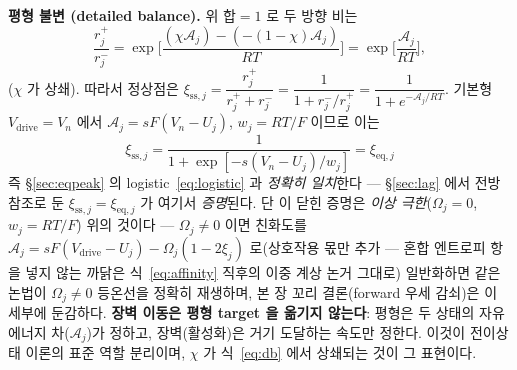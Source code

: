 \documentclass[11pt,a4paper]{article}
\newcommand{\eq}{\mathrm{eq}}
\newcommand{\drive}{\mathrm{drive}}
\newcommand{\sstat}{\mathrm{ss}}
\begin{document}
\textbf{평형 불변 (detailed balance).} 위 합$=1$ 로 두 방향 비는
\begin{equation}
\frac{r_j^+}{r_j^-}=\exp\!\Big[\frac{(\chi\mathcal A_j)-(-(1-\chi)\mathcal A_j)}{RT}\Big]
=\exp\!\Big[\frac{\mathcal A_j}{RT}\Big],
\label{eq:db}
\end{equation}
($\chi$ 가 상쇄). 따라서 정상점은 $\xi_{\sstat,j}=\dfrac{r_j^+}{r_j^++r_j^-}=\dfrac{1}{1+r_j^-/r_j^+}
=\dfrac{1}{1+e^{-\mathcal A_j/RT}}$. 기본형 $V_\drive=V_n$ 에서 $\mathcal A_j=sF(V_n-U_j)$, $w_j=RT/F$ 이므로 이는
\begin{equation}
\xi_{\sstat,j}=\frac{1}{1+\exp[-s(V_n-U_j)/w_j]}=\xi_{\eq,j}
\label{eq:sseq}
\end{equation}
즉 \S\ref{sec:eqpeak} 의 logistic~\eqref{eq:logistic} 과 \emph{정확히 일치}한다 — \S\ref{sec:lag} 에서 전방참조로
둔 $\xi_{\sstat,j}=\xi_{\eq,j}$ 가 여기서 \emph{증명}된다. 단 이 닫힌 증명은 \emph{이상 극한}($\Omega_j=0$,
$w_j=RT/F$) 위의 것이다 — $\Omega_j\ne0$ 이면 친화도를 $\mathcal A_j=sF(V_\drive-U_j)-\Omega_j(1-2\xi_j)$ 로(상호작용
몫만 추가 — 혼합 엔트로피 항을 넣지 않는 까닭은 식~\eqref{eq:affinity} 직후의 이중 계상 논거 그대로) 일반화하면 같은 논법이
$\Omega_j\ne0$ 등온선을 정확히 재생하며, 본 장 꼬리 결론(forward 우세 감쇠)은 이 세부에 둔감하다. \textbf{장벽 이동은 평형 target 을 옮기지 않는다}: 평형은 두
상태의 자유에너지 차($\mathcal A_j$)가 정하고, 장벽(활성화)은 거기 도달하는 속도만 정한다. 이것이 전이상태
이론의 표준 역할 분리이며, $\chi$ 가 식~\eqref{eq:db} 에서 상쇄되는 것이 그 표현이다.
\end{document}

